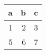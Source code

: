 \documentclass{article}%
\begin{document}
%
\normalsize%
\begin{tabular}{rrr}
\hline
   a &   b &   c \\
\hline
   1 &   2 &   3 \\
   5 &   6 &   7 \\
\hline
\end{tabular}%
\end{document}

